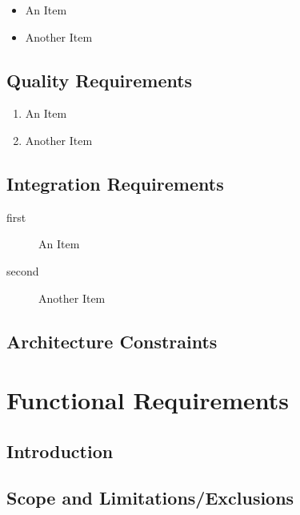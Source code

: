 \documentclass[a4paper]{article}
\begin{document}
\begin{itemize}

\item{An Item}

\item{Another Item}

\end{itemize}

\subsection{Quality Requirements}

\begin{enumerate}

\item{An Item}

\item{Another Item}

\end{enumerate}

\subsection{Integration Requirements}

\begin{description}

\item[first]{An Item}

\item[second]{Another Item}

\end{description}

\subsection{Architecture Constraints}

\section{Functional Requirements}

\subsection{Introduction}

\subsection{Scope and Limitations/Exclusions}
\end{document}
